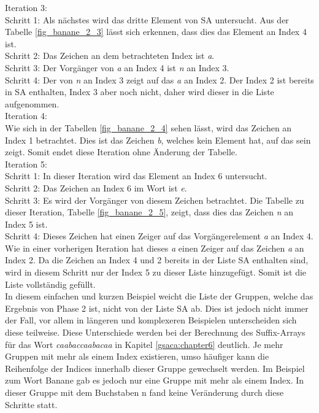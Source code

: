 Iteration 3: \\
Schritt 1: Als nächstes wird das dritte Element von SA untersucht. 
Aus der Tabelle \ref{fig_banane_2_3} lässt sich erkennen, dass dies das Element an Index 4 ist.\\
Schritt 2: Das Zeichen an dem betrachteten Index ist \textit{a}.\\
Schritt 3: Der Vorgänger von \textit{a} an Index 4 ist \textit{n} an Index 3.\\
Schritt 4: Der \prevpointer von \textit{n} an Index 3 zeigt auf das \textit{a} an Index 2. 
Der Index 2 ist bereits in SA enthalten, Index 3 aber noch nicht, daher wird dieser in die Liste aufgenommen.\\

Iteration 4: \\
Wie sich in der Tabellen \ref{fig_banane_2_4} sehen lässt, wird das Zeichen an Index 1 betrachtet. 
Dies ist das Zeichen \textit{b}, welches kein Element hat, auf das sein \prevpointer zeigt. 
Somit endet diese Iteration ohne Änderung der Tabelle.\\

Iteration 5: \\
Schritt 1: In dieser Iteration wird das Element an Index 6 untersucht.\\
Schritt 2: Das Zeichen an Index 6 im Wort ist \textit{e}.\\
Schritt 3: Es wird der Vorgänger von diesem Zeichen betrachtet. 
Die Tabelle zu dieser Iteration, Tabelle \ref{fig_banane_2_5}, zeigt, dass dies das Zeichen \textit{n} an Index 5 ist.\\
Schritt 4: Dieses Zeichen hat einen Zeiger auf das Vorgängerelement \textit{a} an Index 4. 
Wie in einer vorherigen Iteration hat dieses \textit{a} einen Zeiger auf das Zeichen \textit{a} an Index 2. 
Da die Zeichen an Index 4 und 2 bereits in der Liste SA enthalten sind, wird in diesem Schritt nur der Index 5 zu dieser Liste hinzugefügt. 
Somit ist die Liste vollständig gefüllt.\\

In diesem einfachen und kurzen Beispiel weicht die Liste der Gruppen, welche das Ergebnis von Phase 2 ist, nicht von der Liste SA ab.
Dies ist jedoch nicht immer der Fall, vor allem in längeren und komplexeren Beispielen unterscheiden sich diese teilweise. 
Diese Unterschiede werden bei der Berechnung des Suffix-Arrays für das Wort \textit{caabaccaabacaa} in Kapitel \ref{gsaca:chapter6} deutlich. 
Je mehr Gruppen mit mehr als einem Index existieren, umso häufiger kann die Reihenfolge der Indices innerhalb dieser Gruppe gewechselt werden. 
Im Beispiel zum Wort Banane gab es jedoch nur eine Gruppe mit mehr als einem Index. 
In dieser Gruppe mit dem Buchstaben n fand keine Veränderung durch diese Schritte statt.\\
\newpage

